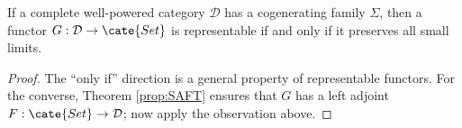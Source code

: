 \begin{corollary}\label{prop:cogenerator-representability}
	If a complete well-powered category $\mathcal{D}$ has a cogenerating family
	$\Sigma$, then a functor $G:\mathcal{D}\to\cate{Set}$ is representable if
	and only if it preserves all small limits.
\end{corollary}
\begin{proof}
	The ``only if'' direction is a general property of representable functors.
	For the converse, Theorem \ref{prop:SAFT} ensures that $G$ has a left
	adjoint $F:\cate{Set}\to\mathcal{D}$; now apply the observation above.
\end{proof}


